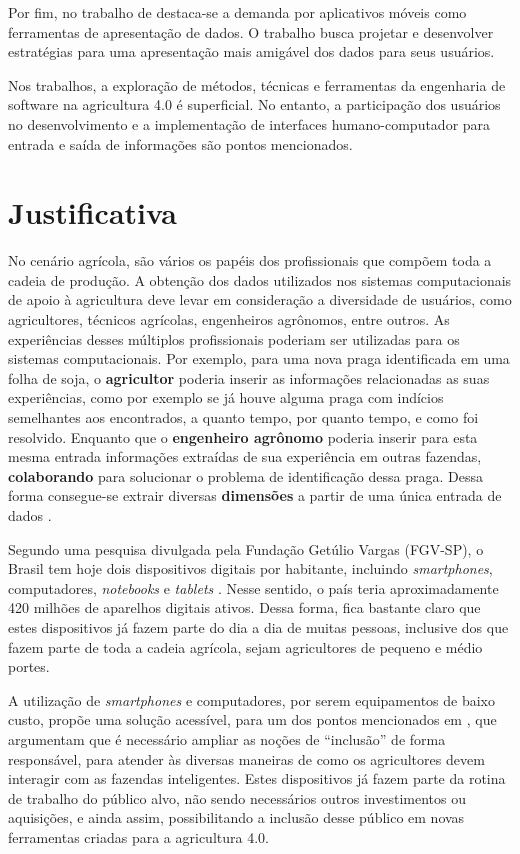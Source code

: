 \documentclass[12pt]{article}
\begin{document}
Por fim, no trabalho de  destaca-se a demanda por aplicativos móveis como ferramentas de apresentação de dados. O trabalho busca projetar e desenvolver estratégias para uma apresentação mais amigável dos dados para seus usuários. 

Nos trabalhos, a exploração de métodos, técnicas e ferramentas da engenharia de software na agricultura 4.0 é superficial. No entanto, a participação dos usuários no desenvolvimento e a implementação de interfaces humano-computador para entrada e saída de informações são pontos mencionados.

\section{Justificativa}
\label{sec:justificativa}

No cenário agrícola, são vários os papéis dos profissionais que compõem toda a cadeia de produção. A obtenção dos dados utilizados nos sistemas computacionais de apoio à agricultura deve levar em consideração a diversidade de usuários, como agricultores, técnicos agrícolas, engenheiros agrônomos, entre outros. As experiências desses múltiplos profissionais poderiam ser utilizadas para os sistemas computacionais. Por exemplo, para uma nova praga identificada em uma folha de soja, o \textbf{agricultor} poderia inserir as informações relacionadas as suas experiências, como por exemplo se já houve alguma praga com indícios semelhantes aos encontrados, a quanto tempo, por quanto tempo, e como foi resolvido. Enquanto que o \textbf{engenheiro agrônomo} poderia inserir para esta mesma entrada informações extraídas de sua experiência em outras fazendas, \textbf{colaborando} para solucionar o problema de identificação dessa praga. Dessa forma consegue-se extrair diversas \textbf{dimensões} a partir de uma única entrada de dados \cite{Walling:2020}.

Segundo uma pesquisa divulgada pela Fundação Getúlio Vargas (FGV-SP), o Brasil tem hoje dois dispositivos digitais por habitante, incluindo \textit{smartphones}, computadores, \textit{notebooks} e \textit{tablets} \cite{FGV:2020}. Nesse sentido, o país teria aproximadamente 420 milhões de aparelhos digitais ativos. Dessa forma, fica bastante claro que estes dispositivos já fazem parte do dia a dia de muitas pessoas, inclusive dos que fazem parte de toda a cadeia agrícola, sejam agricultores de pequeno e médio portes.

A utilização de \textit{smartphones} e computadores, por serem equipamentos de baixo custo, propõe uma solução acessível, para um dos pontos mencionados em , que argumentam que é necessário ampliar as noções de ``inclusão'' de forma responsável, para atender às diversas maneiras de como os agricultores devem interagir com as fazendas inteligentes. Estes dispositivos já fazem parte da rotina de trabalho do público alvo, não sendo necessários outros investimentos ou aquisições, e ainda assim, possibilitando a inclusão desse público em novas ferramentas criadas para a agricultura 4.0.
\end{document}
